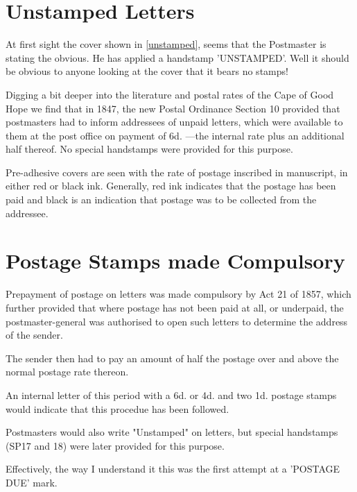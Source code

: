 \section{Unstamped Letters}

At first sight the cover shown in \ref{unstamped}, seems 
that the Postmaster is stating the obvious. He has applied 
a handstamp 'UNSTAMPED'. Well it should be obvious to anyone 
looking at the cover that it bears no stamps!


Digging a bit deeper into the literature and postal rates of 
the Cape of Good Hope we find that in 1847, the new Postal 
Ordinance Section 10 provided that postmasters had to inform 
addressees of unpaid letters, which were
available to them at the post office on payment of 6d. ---the internal 
rate plus an additional half thereof. 
No special handstamps were provided for this purpose.

Pre-adhesive covers are seen with the rate of postage
inscribed in manuscript, in either red or black ink. 
Generally, red ink indicates that the postage has been paid 
and black is an indication that postage was to be collected 
from the addressee.

\section{Postage Stamps made Compulsory}

Prepayment of postage on letters was made compulsory 
by Act 21 of 1857, which further provided that where postage 
has not been paid at all, or underpaid, the postmaster-general 
was authorised to open such letters to determine the address 
of the sender. 

The sender then had to pay an amount of half the postage 
over and above the normal postage rate thereon. 

An internal letter of this period with a 6d. or 4d. and two 1d. 
postage stamps would indicate that this procedue has been followed.

Postmasters would also write "Unstamped" on letters, but 
special handstamps (SP17 and 18) were later provided for this purpose.

Effectively, the way I understand it this was the first 
attempt at a 'POSTAGE DUE' mark.      